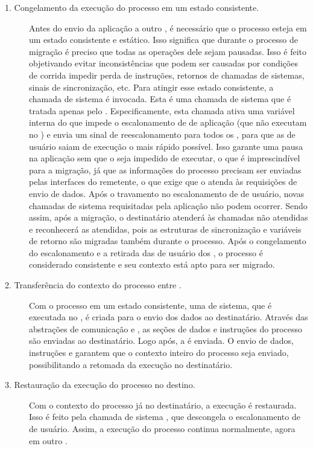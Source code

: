 \begin{description}
	\item[1. Congelamento da execução do processo em um estado consistente.] \hfill
	
	Antes do envio da aplicação a outro \cluster, é necessário que o processo esteja em um estado consistente e estático. Isso significa que durante o processo de migração é preciso que todas as operações dele sejam pausadas. Isso é feito objetivando evitar inconsistências que podem ser causadas por condições de corrida \eg impedir perda de instruções, retornos de chamadas de sistemas, sinais de sincronização, etc. Para atingir esse estado consistente, a chamada de sistema \freeze é invocada. Esta é uma chamada de sistema que é tratada apenas pelo \mcore. Especificamente, esta chamada ativa uma variável interna do \so que impede o escalonamento de \threads de aplicação (\threads que não executam no \mcore) e envia um sinal de reescalonamento para todos os \scores, para que as \threads de usuário saiam de execução o mais rápido possível. Isso garante uma pausa na aplicação sem que o \so seja impedido de executar, o que é imprescindível para a migração, já que as informações do processo precisam ser enviadas pelas interfaces \noc do \cluster remetente, o que exige que o \so atenda às requisições de envio de dados. Após o travamento no escalonamento de \threads de usuário, novas chamadas de sistema requisitadas pela aplicação não podem ocorrer. Sendo assim, após a migração, o \cluster destinatário atenderá às chamadas não atendidas e reconhecerá as atendidas, pois as estruturas de sincronização e variáveis de retorno são migradas também durante o processo. Após o congelamento do escalonamento e a retirada das \threads de usuário dos \scores, o processo é considerado consistente e seu contexto está apto para ser migrado.

	\item[2. Transferência do contexto do processo entre \clusters.] \hfill
	
	Com o processo em um estado consistente, uma \task de sistema, que é executada no \mcore, é criada para o envio dos dados ao \cluster destinatário. Através das abstrações de comunicação \mailbox e \portal, as seções de dados e instruções do processo são enviadas ao \cluster destinatário. Logo após, a \uarea é enviada. O envio de dados, instruções e \uarea garantem que o contexto inteiro do processo seja enviado, possibilitando a retomada da execução no \cluster destinatário.

	\item[3. Restauração da execução do processo no \cluster destino.] \hfill
	
	Com o contexto do processo já no \cluster destinatário, a execução é restaurada. Isso é feito pela chamada de sistema \unfreeze, que descongela o escalonamento de \threads de usuário. Assim, a execução do processo continua normalmente, agora em outro \cluster.
\end{description}

